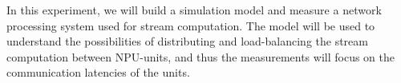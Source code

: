 In this experiment, we will build a simulation model and measure a network processing system used for stream computation. The model will be used to understand the possibilities of distributing and load-balancing the stream computation between NPU-units, and thus the measurements will focus on the communication latencies of the units.

